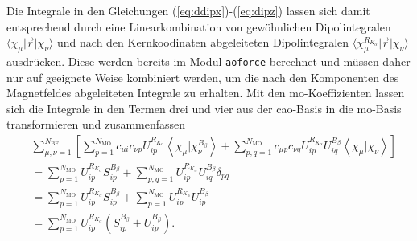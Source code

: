 	Die Integrale in den Gleichungen (\ref{eq:ddipx})-(\ref{eq:dipz}) lassen sich damit entsprechend durch eine Linearkombination von gewöhnlichen Dipolintegralen $\langle\chi_\mu\vert\vec{r}\vert\chi_\nu\rangle$ und nach den Kernkoodinaten abgeleiteten Dipolintegralen $\langle\chi_\mu^{R_{K_\alpha}}\vert\vec{r}\vert\chi_\nu\rangle$ ausdrücken. Diese werden bereits im Modul \texttt{aoforce} berechnet und müssen daher nur auf geeignete Weise kombiniert werden, um die nach den Komponenten des Magnetfeldes abgeleiteten Integrale zu erhalten. Mit den \ac{mo}-Koeffizienten lassen sich die Integrale in den Termen drei und vier aus der \ac{cao}-Basis in die \ac{mo}-Basis transformieren und zusammenfassen\supercite{nicu2008vibrational}	
	\begin{equation}\label{eq:term3+4}
	\begin{aligned}
	&\sum_{\mu,\nu=1}^{N_{\text{BF}}}\left[\sum_{p=1}^{N_{\text{MO}}}c_{\mu i}c_{\nu p}U_{ip}^{R_{K_\alpha}}\left\langle\chi_\mu\vert\chi_\nu^{B_{\beta}}\right\rangle+\sum_{p,q=1}^{N_{\text{MO}}}c_{\mu p}c_{\nu q}U_{ip}^{R_{K_\alpha}}U_{iq}^{B_\beta}\left\langle\chi_\mu\vert\chi_\nu\right\rangle\right]\\
	&=\sum_{p=1}^{N_{\text{MO}}}U_{ip}^{R_{K_\alpha}}S_{ip}^{B_\beta}+\sum_{p,q=1}^{N_{\text{MO}}}U_{ip}^{R_{K_\alpha}}U_{iq}^{B_\beta}\delta_{pq}\\
	&=\sum_{p=1}^{N_{\text{MO}}}U_{ip}^{R_{K_\alpha}}S_{ip}^{B_\beta}+\sum_{p=1}^{N_{\text{MO}}}U_{ip}^{R_{K_\alpha}}U_{ip}^{B_\beta}\\
	&=\sum_{p=1}^{N_{\text{MO}}}U_{ip}^{R_{K_\alpha}}\left(S_{ip}^{B_\beta}+U_{ip}^{B_\beta}\right).
	\end{aligned}
	\end{equation}
	
